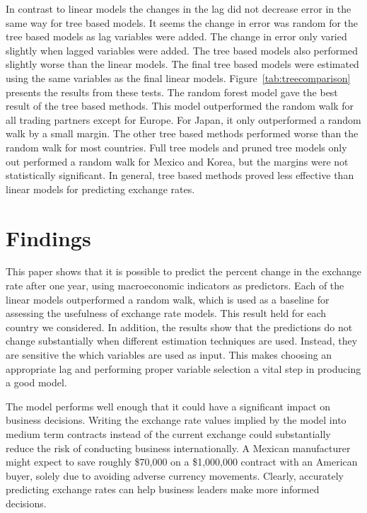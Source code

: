 \documentclass{sig-alternate-05-2015}
\begin{document}
\par{} In contrast to linear models the changes in the lag did not decrease error in the same way for tree based models. It seems the change in error was random for the tree based models as lag variables were added. The change in error only varied slightly when lagged variables were added. The tree based models also performed slightly worse than the linear models. The final tree based models were estimated using the same variables as the final linear models. Figure~\ref{tab:treecomparison} presents the results from these tests. The random forest model gave the best result of the  tree based methods. This model outperformed the random walk for all trading partners except for Europe. For Japan, it only outperformed a random walk by a small margin. The other tree based methods performed worse than the random walk for most countries. Full tree models and pruned tree models only out performed a random walk for Mexico and Korea, but the margins were not statistically significant. In general, tree based methods proved less effective than linear models for predicting exchange rates.


\section{Findings}

This paper shows that it is possible to predict the percent change in the exchange rate after one year, using macroeconomic indicators as predictors. Each of the linear models outperformed a random walk, which is used as a baseline for assessing the usefulness of exchange rate models. This result held for each country we considered. In addition, the results show that the predictions do not change substantially when different estimation techniques are used. Instead, they are sensitive the which variables are used as input. This makes choosing an appropriate lag and performing proper variable selection a vital step in producing a good model.

The model performs well enough that it could have a significant impact on business decisions. Writing the exchange rate values implied by the model into medium term contracts instead of the current exchange could substantially reduce the risk of conducting business internationally. A Mexican manufacturer might expect to save roughly \$70,000 on a \$1,000,000 contract with an American buyer, solely due to avoiding adverse currency movements. Clearly, accurately predicting exchange rates can help business leaders make more informed decisions.
\end{document}
